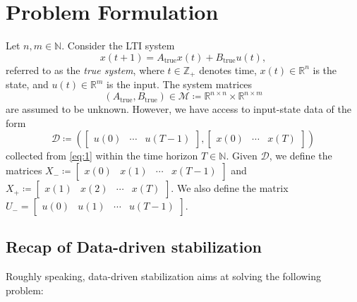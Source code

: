\documentclass[10pt,a4paper]{amsart}
\begin{document}
\setcounter{section}{1}
\section{Problem Formulation}
\label{sec:II}

Let $n,m\in\mathbb{N}$. Consider the LTI system
\begin{equation}
\label{eq:1}
x(t+1)=A_\text{true}x(t)+B_\text{true}u(t),
\end{equation}
referred to as the \emph{true system}, where $t\in\mathbb{Z}_+$ denotes time, \mbox{$x(t)\in\mathbb{R}^n$} is the state, and $u(t)\in\mathbb{R}^m$ is the input. The system matrices 
\begin{equation}
(A_\text{true},B_\text{true}) \in \mathcal{M} \coloneqq \mathbb{R}^{n \times n} \times \mathbb{R}^{n \times m}
\end{equation}
are assumed to be unknown. However, we have access to input-state data of the form
\begin{equation}
\label{eq:data}
\mathcal{D}\coloneqq\left(\begin{bmatrix}
    u(0)  & \cdots & u(T-1)
\end{bmatrix}, \begin{bmatrix}
    x(0) & \cdots & x(T)
\end{bmatrix}\right)
\end{equation} 
collected from \eqref{eq:1} within the time horizon $T\in\mathbb{N}$. Given $\mathcal{D}$, we define the matrices \mbox{$X_{-}\coloneqq \begin{bmatrix}
x(0) & x(1) & \cdots & x(T-1)
\end{bmatrix}$} and $X_{+}\coloneqq \begin{bmatrix}
x(1) & x(2) & \cdots & x(T)
\end{bmatrix}$. We also define the matrix \mbox{$U_- = \begin{bmatrix} u(0) & u(1) & \cdots & u(T-1) \end{bmatrix}$}. 

\subsection{Recap of Data-driven stabilization}

Roughly speaking, data-driven stabilization aims at solving the following problem:
\end{document}
